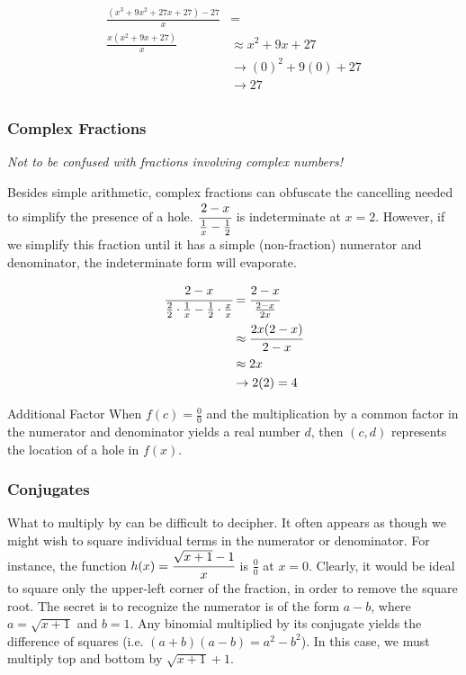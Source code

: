 \begin{align*}
\frac{(x^3+9x^2+27x+27)-27}{x} &=\\
\frac{x(x^2+9x+27)}{x} & \approx x^2+9x+27\\
& \rightarrow (0)^2+9(0)+27 \\
&\rightarrow 27\\
\end{align*}


\subsubsection{Complex Fractions}
\emph{Not to be confused with fractions involving complex numbers!}

Besides simple arithmetic, complex fractions can obfuscate the cancelling 
needed to simplify the presence
of a hole.  $\cfrac{2-x}{\frac{1}{x}-\frac{1}{2}}$ is indeterminate at $x=2$.  
However, if we simplify this fraction until it has a simple (non-fraction) numerator and 
denominator, the indeterminate form will evaporate.


\begin{align*}
\cfrac{2-x}{\frac{2}{2}\cdot\frac{1}{x}-\frac{1}{2}\cdot\frac{x}{x}} &= \cfrac{2-x}{\frac{2-x}{2x}} \\
&\approx \cfrac{2x(2-x)}{2-x} \\
&\approx 2x\\
&\rightarrow 2(2) = 4
\end{align*}



\begin{derivation}{Additional Factor}
When $f(c)=\frac{0}{0}$ and the multiplication by a common factor in the numerator and denominator yields a real number $d$,
then $(c,d)$ represents the location of a hole in $f(x)$.
\end{derivation}



\subsubsection{Conjugates}
What to multiply by can be difficult to decipher.  It often appears as though 
we might wish to square individual terms  in the numerator or denominator.  
For instance, the function $h(x) = \cfrac{\sqrt{x+1}-1}{x}$ is $\frac{0}{0}$ at $x=0$.
Clearly, it would be ideal to square only the upper-left corner of the fraction, 
in order to remove the square root.  The
secret is to recognize the numerator is of the form $a-b$, where 
$a=\sqrt{x+1}$ and $b=1$.  Any binomial multiplied
by its conjugate yields the difference of squares (i.e. $(a+b)(a-b)=a^2-b^2$).  
In this case, we must multiply top and bottom by $\sqrt{x+1}+1$.


